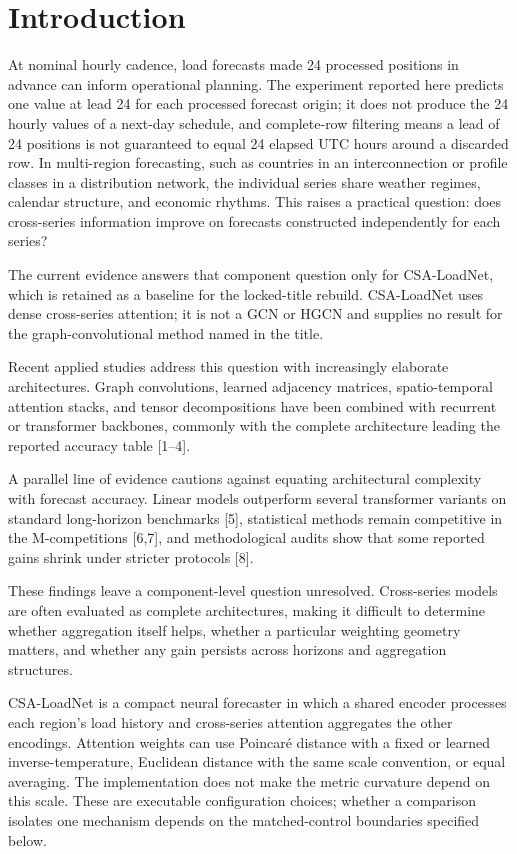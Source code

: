 \documentclass[electronics,article,submit,moreauthors]{Definitions/mdpi}
\begin{document}
\section{Introduction}\label{introduction}

At nominal hourly cadence, load forecasts made 24 processed positions in advance can inform operational planning. The experiment reported here predicts one value at lead 24 for each processed forecast origin; it does not produce the 24 hourly values of a next-day schedule, and complete-row filtering means a lead of 24 positions is not guaranteed to equal 24 elapsed UTC hours around a discarded row. In multi-region forecasting, such as countries in an interconnection or profile classes in a distribution network, the individual series share weather regimes, calendar structure, and economic rhythms. This raises a practical question: does cross-series information improve on forecasts constructed independently for each series?

The current evidence answers that component question only for CSA-LoadNet, which is retained as a baseline for the locked-title rebuild. CSA-LoadNet uses dense cross-series attention; it is not a GCN or HGCN and supplies no result for the graph-convolutional method named in the title.

Recent applied studies address this question with increasingly elaborate architectures. Graph convolutions, learned adjacency matrices, spatio-temporal attention stacks, and tensor decompositions have been combined with recurrent or transformer backbones, commonly with the complete architecture leading the reported accuracy table {[}1--4{]}.

A parallel line of evidence cautions against equating architectural complexity with forecast accuracy. Linear models outperform several transformer variants on standard long-horizon benchmarks {[}5{]}, statistical methods remain competitive in the M-competitions {[}6,7{]}, and methodological audits show that some reported gains shrink under stricter protocols {[}8{]}.

These findings leave a component-level question unresolved. Cross-series models are often evaluated as complete architectures, making it difficult to determine whether aggregation itself helps, whether a particular weighting geometry matters, and whether any gain persists across horizons and aggregation structures.

CSA-LoadNet is a compact neural forecaster in which a shared encoder processes each region's load history and cross-series attention aggregates the other encodings. Attention weights can use Poincar\'{e} distance with a fixed or learned inverse-temperature, Euclidean distance with the same scale convention, or equal averaging. The implementation does not make the metric curvature depend on this scale. These are executable configuration choices; whether a comparison isolates one mechanism depends on the matched-control boundaries specified below.
\end{document}
